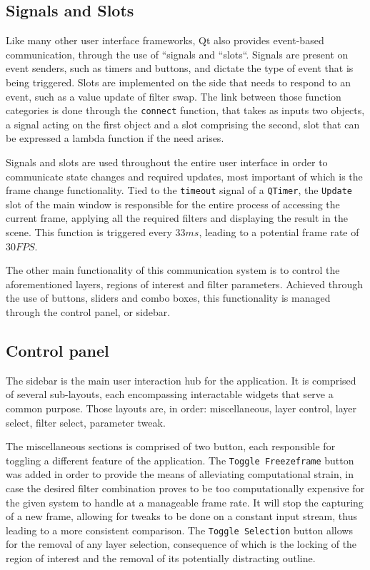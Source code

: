 \subsection{Signals and Slots}

Like many other user interface frameworks, Qt also provides event-based communication, through the use of
``signals and ``slots``. Signals are present on event senders, such as timers and buttons, and dictate the
type of event that is being triggered. Slots are implemented on the side that needs to respond to an event,
such as a value update of filter swap. The link between those function categories is done through the
\verb|connect| function, that takes as inputs two objects, a signal acting on the first object and a slot
comprising the second, slot that can be expressed a lambda function if the need arises. \cite{qtDoc}

Signals and slots are used throughout the entire user interface in order to communicate state changes and
required updates, most important of which is the frame change functionality. Tied to the \verb|timeout|
signal of a \verb|QTimer|, the \verb|Update| slot of the main window is responsible for the entire process
of accessing the current frame, applying all the required filters and displaying the result in the scene.
This function is triggered every \(33 ms\), leading to a potential frame rate of \(30 FPS\).

The other main functionality of this communication system is to control the aforementioned layers, regions
of interest and filter parameters. Achieved through the use of buttons, sliders and combo boxes, this
functionality is managed through the control panel, or sidebar.

\subsection{Control panel}

The sidebar is the main user interaction hub for the application. It is comprised of several sub-layouts,
each encompassing interactable widgets that serve a common purpose. Those layouts are, in order:
miscellaneous, layer control, layer select, filter select, parameter tweak.

The miscellaneous sections is comprised of two button, each responsible for toggling a different feature of
the application. The \verb|Toggle Freezeframe| button was added in order to provide the means of alleviating
computational strain, in case the desired filter combination proves to be too computationally expensive for
the given system to handle at a manageable frame rate. It will stop the capturing of a new frame, allowing for
tweaks to be done on a constant input stream, thus leading to a more consistent comparison. The
\verb|Toggle Selection| button allows for the removal of any layer selection, consequence of which is the
locking of the region of interest and the removal of its potentially distracting outline.

